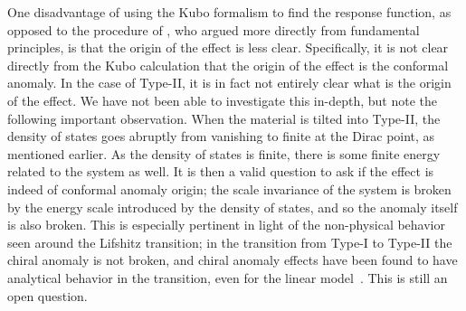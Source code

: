 One disadvantage of using the Kubo formalism to find the response function, as opposed to the procedure of \textcite{chernodubGenerationNernstCurrent2018}, who argued more directly from fundamental principles, is that the origin of the effect is less clear.
Specifically, it is not clear directly from the Kubo calculation that the origin of the effect is the conformal anomaly.
In the case of Type-II, it is in fact not entirely clear what is the origin of the effect.
We have not been able to investigate this in-depth, but note the following important observation.
When the material is tilted into Type-II, the density of states goes abruptly from vanishing to finite at the Dirac point, as mentioned earlier.
As the density of states is finite, there is some finite energy related to the system as well.
It is then a valid question to ask if the effect is indeed of conformal anomaly origin;
the scale invariance of the system is broken by the energy scale introduced by the density of states, and so the anomaly itself is also broken.
This is especially pertinent in light of the non-physical behavior seen around the Lifshitz transition;
in the transition from Type-I to Type-II the chiral anomaly is not broken, and chiral anomaly effects have been found to have analytical behavior in the transition, even for the linear model~\cite{sharmaChiralAnomalyLongitudinal2017}.
This is still an open question.


